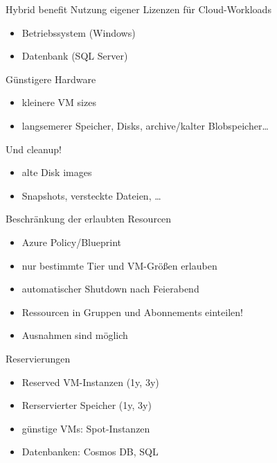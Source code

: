 \begin{flashcard}[Definition]{Hybrid benefit}
  Nutzung eigener Lizenzen für Cloud-Workloads
  \begin{itemize}
    \item Betriebssystem (Windows)
    \item Datenbank (SQL Server)
  \end{itemize}
\end{flashcard}

\begin{flashcard}[Definition]{Günstigere Hardware}
  \begin{itemize}
    \item kleinere VM sizes
    \item langsemerer Speicher, Disks, archive/kalter Blobspeicher\ldots
  \end{itemize}
  Und cleanup!
  \begin{itemize}
    \item alte Disk images
    \item Snapshots, versteckte Dateien, \ldots
  \end{itemize}
\end{flashcard}

\begin{flashcard}[Definition]{Beschränkung der erlaubten Resourcen}
  \begin{itemize}
    \item Azure Policy/Blueprint
    \item nur bestimmte Tier und VM-Größen erlauben
    \item automatischer Shutdown nach Feierabend
    \item Ressourcen in Gruppen und Abonnements einteilen!
    \item Ausnahmen sind möglich
  \end{itemize}
\end{flashcard}

\begin{flashcard}[Definition]{Reservierungen}
  \begin{itemize}
    \item Reserved VM-Instanzen (1y, 3y)
    \item Rerservierter Speicher (1y, 3y)
    \item günstige VMs: Spot-Instanzen
    \item Datenbanken: Cosmos DB, SQL
  \end{itemize}
\end{flashcard}

